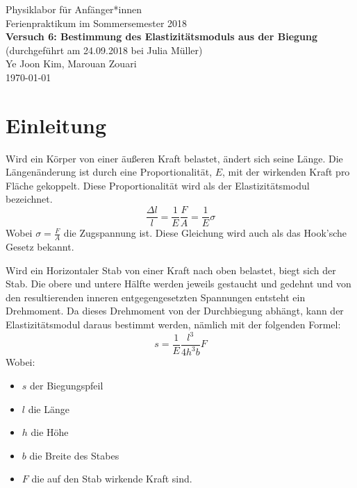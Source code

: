 \documentclass[11pt,a4paper]{article}
\begin{document}
{
	\centering 
	\large 
	Physiklabor für Anfänger*innen \\
	Ferienpraktikum im Sommersemester 2018 \\[4mm]
	\textbf{\LARGE 
		Versuch 6: Bestimmung des Elastizitätsmoduls aus der Biegung
	} \\[3mm]
	(durchgeführt am 24.09.2018 bei Julia Müller) \\
	Ye Joon Kim, Marouan Zouari\\
	\today \\[10mm]
}
\tableofcontents
\newpage
\section{Einleitung}
Wird ein Körper von einer äußeren Kraft belastet, ändert sich seine Länge. Die Längenänderung ist durch eine Proportionalität, $E$, mit der wirkenden Kraft pro Fläche gekoppelt. Diese Proportionalität wird als der Elastizitätsmodul bezeichnet. 
\begin{equation}
\frac{\Delta l}{l} = \frac{1}{E}\frac{F}{A} = \frac{1}{E}\sigma
\end{equation}
Wobei $\sigma = \frac{F}{A}$ die Zugspannung ist. Diese Gleichung wird auch als das Hook'sche Gesetz bekannt.

Wird ein Horizontaler Stab von einer Kraft nach oben belastet, biegt sich der Stab. Die obere und untere Hälfte werden jeweils gestaucht und gedehnt und von den resultierenden inneren entgegengesetzten Spannungen entsteht ein Drehmoment. Da dieses Drehmoment von der Durchbiegung abhängt, kann der Elastizitätsmodul daraus bestimmt werden, nämlich mit der folgenden Formel:
\begin{equation}
s = \frac{1}{E}\frac{l^3}{4h^3b}F
\end{equation}
Wobei:
\begin{itemize}
	\item $s$ der Biegungspfeil
	\item $l$ die Länge 
	\item $h$ die Höhe
	\item $b$ die Breite des Stabes
	\item $F$ die auf den Stab wirkende Kraft sind.
\end{itemize}
\end{document}
